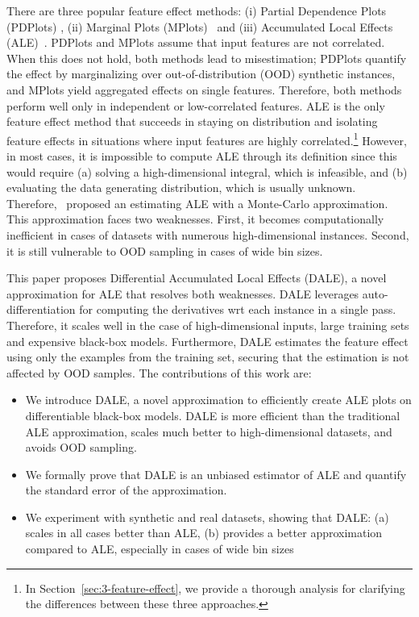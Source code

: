 \documentclass[wcp]{jmlr}
\begin{document}
There are three popular feature effect methods: (i) Partial Dependence Plots (PDPlots) \citep{Friedman2001}, (ii) Marginal Plots (MPlots)~\citep{Apley2020} and (iii) Accumulated Local Effects (ALE)~\citep{Apley2020}. PDPlots and MPlots assume that input features are not correlated. When this does not hold, both methods lead to misestimation; PDPlots quantify the effect by marginalizing over out-of-distribution (OOD) synthetic instances, and MPlots yield aggregated effects on single features. Therefore, both methods perform well only in independent or low-correlated features. ALE is the only feature effect method that succeeds in staying on distribution and isolating feature effects in situations where input features are highly correlated.\footnote{In Section~\ref{sec:3-feature-effect}, we provide a thorough analysis for clarifying the differences between these three approaches.} However, in most cases, it is impossible to compute ALE through its definition since this would require (a) solving a high-dimensional integral, which is infeasible, and (b) evaluating the data generating distribution, which is usually unknown. Therefore,~\cite{Apley2020} proposed an estimating ALE with a Monte-Carlo approximation. This approximation faces two weaknesses. First, it becomes computationally inefficient in cases of datasets with numerous high-dimensional instances. Second, it is still vulnerable to OOD sampling in cases of wide bin sizes.

This paper proposes Differential Accumulated Local Effects (DALE), a novel approximation for ALE that resolves both weaknesses. DALE leverages auto-differentiation for computing the derivatives wrt each instance in a single pass. Therefore, it scales well in the case of high-dimensional inputs, large training sets and expensive black-box models. Furthermore, DALE estimates the feature effect using only the examples from the training set, securing that the estimation is not affected by OOD samples.
%
The contributions of this work are:
%
\begin{itemize}
\item We introduce DALE, a novel approximation to efficiently create ALE plots on differentiable black-box models. DALE is more efficient than the traditional ALE approximation, scales much better to high-dimensional datasets, and avoids OOD sampling.
\item We formally prove that DALE is an unbiased estimator of ALE and quantify the standard error of the approximation.
\item We experiment with synthetic and real datasets, showing that DALE: (a) scales in all cases better than ALE, (b) provides a better approximation compared to ALE, especially in cases of wide bin sizes
\end{itemize}
\end{document}
